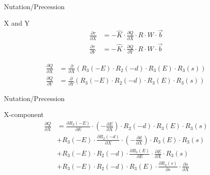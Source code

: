\documentclass[14pt,table,t, c]{beamer}
\begin{document}
\begin{frame}{Nutation/Precession}
\begin{block}{X and Y}
\vspace*{-\baselineskip}\setlength\belowdisplayskip{0pt}\setlength\abovedisplayskip{0pt}
\begin{align*}
\frac{\partial \tau}{\partial X} &= - \hat{K} \cdot \frac{\partial Q}{\partial X} \cdot R \cdot W \cdot \vec{b} \\
\frac{\partial \tau}{\partial Y} &= - \hat{K} \cdot \frac{\partial Q}{\partial Y} \cdot R \cdot W \cdot \vec{b}
\end{align*}
\end{block}
\begin{block}{\vspace*{-3ex}}
\vspace*{-\baselineskip}\setlength\belowdisplayskip{0pt}\setlength\abovedisplayskip{0pt}
\begin{align*}
\frac{\partial Q}{\partial X} &= \frac{\partial }{\partial X} (R_3(-E) \cdot R_2(-d) \cdot R_3(E) \cdot R_3(s)) \\
\frac{\partial Q}{\partial Y} &= \frac{\partial }{\partial Y} (R_3(-E) \cdot R_2(-d) \cdot R_3(E) \cdot R_3(s)) 
\end{align*}
\end{block}
\end{frame}

\begin{frame}{Nutation/Precession}
\begin{block}{X-component}
\vspace*{-\baselineskip}\setlength\belowdisplayskip{0pt}\setlength\abovedisplayskip{0pt}
\begin{align*}
\frac{\partial Q}{\partial X}
&= \frac{\partial R_3(-E)}{\partial E} \cdot (-\frac{\partial E}{\partial X}) \cdot R_2(-d) \cdot R_3(E) \cdot R_3(s) \\
&+ R_3(-E) \cdot \frac{\partial R_2(-d)}{\partial X} \cdot (-\frac{\partial d}{\partial X})\cdot R_3(E) \cdot R_3(s) \\
&+ R_3(-E) \cdot R_2(-d) \cdot \frac{\partial R_3(E)}{\partial E} \cdot \frac{\partial E}{\partial X} \cdot R_3(s)\\
&+ R_3(-E) \cdot R_2(-d) \cdot R_3(E) \cdot \frac{\partial R_3(s)}{\partial s} \cdot \frac{\partial s}{\partial X}
\end{align*}
\end{block}
\end{frame}
\end{document}

